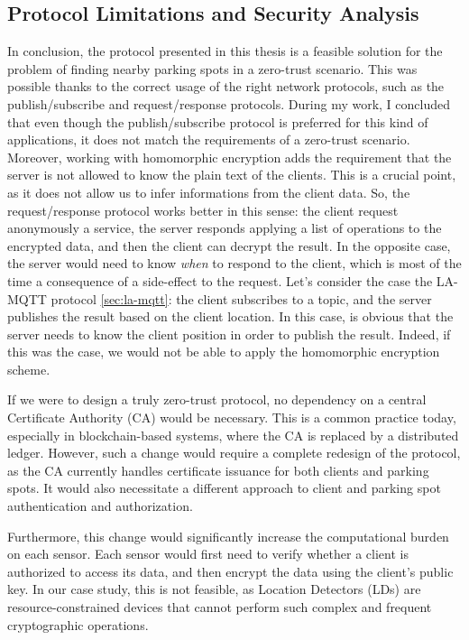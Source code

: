 \subsection{Protocol Limitations and Security Analysis}

In conclusion, the protocol presented in this thesis is a feasible solution for the problem of finding nearby parking spots in a zero-trust scenario. This was possible thanks to the correct usage of the right network protocols, such as the publish/subscribe and request/response protocols. During my work, I concluded that even though the publish/subscribe protocol is preferred for this kind of applications, it does not match the requirements of a zero-trust scenario. Moreover, working with homomorphic encryption adds the requirement that the server is not allowed to know the plain text of the clients. This is a crucial point, as it does not allow us to infer informations from the client data. So, the request/response protocol works better in this sense: the client request anonymously a service, the server responds applying a list of operations to the encrypted data, and then the client can decrypt the result. In the opposite case, the server would need to know \emph{when} to respond to the client, which is most of the time a consequence of a side-effect to the request. Let's consider the case the LA-MQTT protocol \cref{sec:la-mqtt}: the client subscribes to a topic, and the server publishes the result based on the client location. In this case, is obvious that the server needs to know the client position in order to publish the result. Indeed, if this was the case, we would not be able to apply the homomorphic encryption scheme.

If we were to design a truly zero-trust protocol, no dependency on a central Certificate Authority (CA) would be necessary. This is a common practice today, especially in blockchain-based systems, where the CA is replaced by a distributed ledger. However, such a change would require a complete redesign of the protocol, as the CA currently handles certificate issuance for both clients and parking spots. It would also necessitate a different approach to client and parking spot authentication and authorization.

Furthermore, this change would significantly increase the computational burden on each sensor. Each sensor would first need to verify whether a client is authorized to access its data, and then encrypt the data using the client’s public key. In our case study, this is not feasible, as Location Detectors (LDs) are resource-constrained devices that cannot perform such complex and frequent cryptographic operations.

